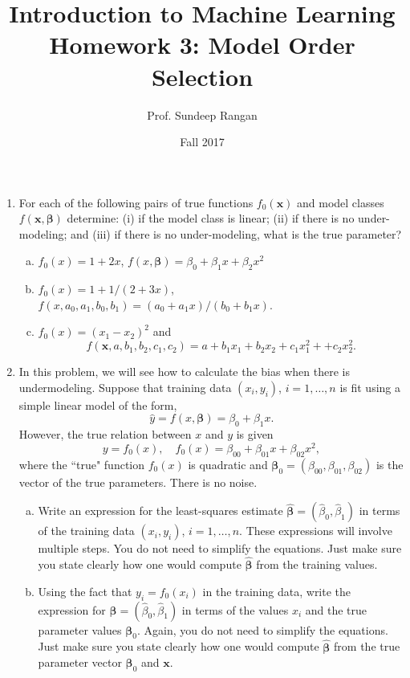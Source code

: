 \documentclass[11pt]{article}
\newcommand{\xbf}{\mathbf{x}}
\def\betahat{\widehat{\beta}}
\def\betabf{{\boldsymbol \beta}}
\def\betabfhat{{\widehat{\bm{\beta}}}}
\begin{document}
\title{Introduction to Machine Learning\\
Homework 3:  Model Order Selection}
\author{Prof. Sundeep Rangan}
\date{Fall 2017}

\maketitle

\begin{enumerate}

\item For each of the following pairs of true functions $f_0(\xbf)$ and model classes $f(\xbf,\betabf)$
determine: (i) if the model class is linear; (ii) if there is no under-modeling; and (iii) if there
is no under-modeling, what is the true parameter?
\begin{enumerate}[(a)]
  \item $f_0(x) = 1+2x$,  $f(x,\betabf) = \beta_0+\beta_1x+\beta_2x^2$
  \item $f_0(x) = 1 + 1/(2+3x)$, $f(x,a_0,a_1,b_0,b_1) = (a_0+a_1x)/(b_0+b_1 x)$.
  \item $f_0(x) = (x_1-x_2)^2$ and
\[
    f(\xbf,a,b_1,b_2,c_1,c_2) = a + b_1x_1 + b_2x_2 + c_{1}x_1^2 +  + c_{2}x_2^2.
\]
\end{enumerate}

\item In this problem, we will see how to calculate the bias when
there is undermodeling.  Suppose that training data $(x_i,y_i)$, $i=1,\ldots,n$
is fit using a simple linear model of the form,
\[
    \hat{y} = f(x,\betabf) = \beta_0 + \beta_1 x.
\]
However, the true relation between $x$ and $y$ is given
\[
    y = f_0(x), \quad f_0(x)=\beta_{00} + \beta_{01}x + \beta_{02} x^2,
\]
where the ``true" function $f_0(x)$ is quadratic and
$\betabf_0=(\beta_{00},\beta_{01},\beta_{02})$ is the vector of the true parameters. There is no noise.
\begin{enumerate}[(a)]
\item Write an expression
for the least-squares estimate $\betabfhat = (\betahat_0,\betahat_1)$ in terms of the training data
$(x_i,y_i)$, $i=1,\ldots,n$.
These expressions will  involve multiple steps.
You do not need to simplify the equations.
Just make sure you state clearly how one would compute $\betabfhat$ from the training values.

\item Using the fact that $y_i=f_0(x_i)$ in the training data, write the expression for
$\betabf = (\betahat_0,\betahat_1)$ in terms of the values $x_i$ and the true parameter
values $\betabf_0$.
Again, you do not need to simplify the equations.
Just make sure you state clearly how one would compute $\betabfhat$ from the true
parameter vector $\betabf_0$ and $\xbf$.


\end{enumerate}
\end{enumerate}
\end{document}
